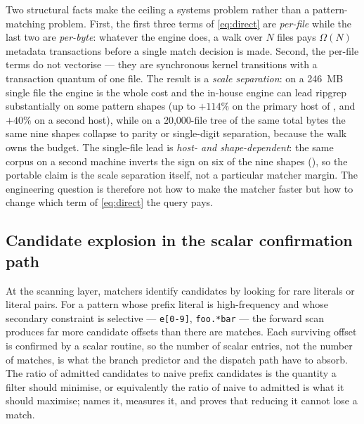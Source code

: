 \documentclass[11pt,letterpaper]{article}
\begin{document}
Two structural facts make the ceiling a systems problem rather than a
pattern-matching problem. First, the first three terms of
\eqref{eq:direct} are \emph{per-file} while the last two are
\emph{per-byte}: whatever the engine does, a walk over $N$ files pays
$\Omega(N)$ metadata transactions before a single match decision is made.
Second, the per-file terms do not vectorise --- they are synchronous kernel
transitions with a transaction quantum of one file. The result is a
\emph{scale separation}: on a 246~MB single file the engine is the whole
cost and the in-house engine can lead ripgrep substantially on some
pattern shapes (up to $+114\%$ on the primary host of , and
$+40\%$ on a second host), while on a 20{,}000-file tree of the same total
bytes the same nine shapes collapse to parity or single-digit separation,
because the walk owns the budget. The single-file lead is
\emph{host- and shape-dependent}: the same corpus on a second machine
inverts the sign on six of the nine shapes (), so the
portable claim is the scale separation itself, not a particular matcher
margin. The engineering question is therefore not how to make the matcher
faster but how to change which term of \eqref{eq:direct} the query pays.

\subsection{Candidate explosion in the scalar confirmation path}
At the scanning layer, matchers identify candidates by looking for rare
literals or literal pairs. For a pattern whose prefix literal is
high-frequency and whose secondary constraint is selective --- \texttt{e[0-9]},
\texttt{foo.*bar} --- the forward scan produces far more candidate offsets
than there are matches. Each surviving offset is confirmed by a scalar
routine, so the number of scalar entries, not the number of matches, is what
the branch predictor and the dispatch path have to absorb. The ratio of
admitted candidates to naive prefix candidates is the quantity a filter
should minimise, or equivalently the ratio of naive to admitted is what it
should maximise;  names it, measures it, and
 proves that reducing it cannot lose a match.
\end{document}
